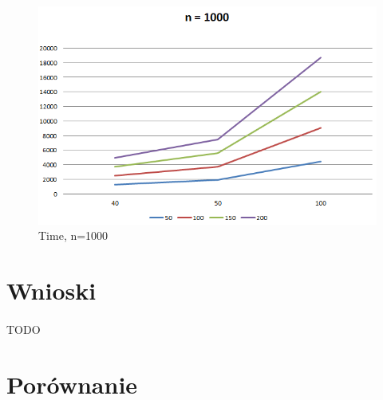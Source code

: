 \documentclass[wide,a4paper,titlepage,12pt] {article}
\begin{document}
\begin{figure}[htbp]
  \begin{center}
         \includegraphics[scale = 0.7]{img/GA_n_1000.PNG}
         \caption{Time, n=1000}
  \end{center}
\end{figure}


\newpage

\section{Wnioski}
\paragraph{}
TODO


\newpage
\section{Porównanie}
\paragraph{} %
\label{par:}
\end{document}
